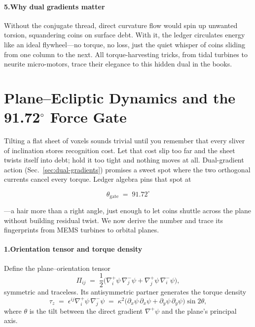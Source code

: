 \documentclass[11pt,oneside]{book}
\begin{document}
\paragraph*{5.\;Why dual gradients matter}

Without the conjugate thread, direct curvature flow would spin up
unwanted torsion, squandering coins on surface debt.  
With it, the ledger circulates energy like an ideal flywheel—no torque,
no loss, just the quiet whisper of coins sliding from one column to the
next.  All torque-harvesting tricks, from tidal turbines to neurite
micro-motors, trace their elegance to this hidden dual in the books.

\section{Plane–Ecliptic Dynamics and the 91.72$^{\circ}$ Force Gate}
\label{sec:plane-ecliptic-gate}

Tilting a flat sheet of voxels sounds trivial until you remember that every sliver of inclination stores recognition cost.  
Let that cost slip too far and the sheet twists itself into debt; hold it too tight and nothing moves at all.  
Dual-gradient action (Sec.~\ref{sec:dual-gradients}) promises a sweet spot where the two orthogonal currents cancel every torque.  
Ledger algebra pins that spot at

\[
  \boxed{\;\theta_{\!\text{gate}} \;=\; 91.72^{\circ}\;}
\]

—a hair more than a right angle, just enough to let coins shuttle across
the plane without building residual twist.  We now derive the number and
trace its fingerprints from MEMS turbines to orbital planes.

\paragraph*{1.\;Orientation tensor and torque density}

Define the plane–orientation tensor
\[
  \Pi_{ij}
  \;=\;
  \frac{1}{2}
  \bigl(
    \nabla^{\!+}_{i}\psi\,\nabla^{\!-}_{j}\psi
    + \nabla^{\!+}_{j}\psi\,\nabla^{\!-}_{i}\psi
  \bigr),
\]
symmetric and traceless.  Its antisymmetric partner generates the torque
density
\[
  \tau_{z}
  \;=\;
  \epsilon^{ij}\nabla^{\!+}_{i}\psi\,\nabla^{\!-}_{j}\psi
  \;=\;
  \kappa^{2}
  \bigl(\partial_{x}\psi\,\partial_{x}\psi
       +\partial_{y}\psi\,\partial_{y}\psi\bigr)\sin2\theta,
\]
where $\theta$ is the tilt between the direct gradient
$\nabla^{\!+}\psi$ and the plane’s principal axis.
\end{document}
